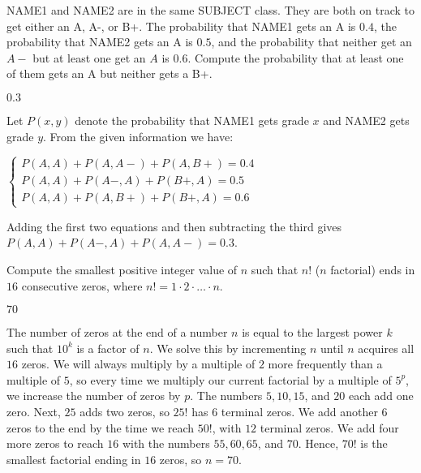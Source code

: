 \documentclass[11pt]{article}
\begin{document}
\begin{problem}
NAME1 and NAME2 are in the same SUBJECT class. They are both on track to get either an A, A-, or B+. The probability that NAME1 gets an A is $0.4$, the probability that NAME2 gets an A is $0.5$, and the probability that neither get an $A-$ but at least one get an $A$ is $0.6$. Compute the probability that at least one of them gets an A but neither gets a B+.
\end{problem}

\begin{answer}
$\boxed{0.3}$
\end{answer}

\begin{solution}
Let $P(x, y)$ denote the probability that NAME1 gets grade $x$ and NAME2 gets grade $y$. From the given information we have: \begin{center}$\begin{cases} P(A, A) + P(A, A-) + P(A, B+) = 0.4 \\ P(A, A) + P(A-, A) + P(B+, A) = 0.5 \\ P(A, A) + P(A, B+) + P(B+, A) = 0.6\end{cases}$\end{center} Adding the first two equations and then subtracting the third gives $P(A, A) + P(A-, A) + P(A, A-) = \boxed{0.3}$.
\end{solution}


\begin{problem}%
Compute the smallest positive integer value of $n$ such that $n!$ ($n$ factorial) ends in $16$ consecutive zeros, where $n! = 1 \cdot 2 \cdot \ldots \cdot n$.
\end{problem}

\begin{answer}
$\boxed{70}$
\end{answer}

\begin{solution}
The number of zeros at the end of a number $n$ is equal to the largest power $k$ such that $10^k$ is a factor of $n$. We solve this by incrementing $n$ until $n$ acquires all $16$ zeros. We will always multiply by a multiple of $2$ more frequently than a multiple of $5$, so every time we multiply our current factorial by a multiple of $5^p$, we increase the number of zeros by $p$. The numbers $5, 10, 15$, and $20$ each add one zero. Next, $25$ adds two zeros, so $25!$ has 6 terminal zeros. We add another $6$ zeros to the end by the time we reach $50!$, with $12$ terminal zeros. We add four more zeros to reach $16$ with the numbers $55, 60, 65$, and $70$. Hence, $70!$ is the smallest factorial ending in $16$ zeros, so $n = \boxed{70}$.
\end{solution}
\end{document}
